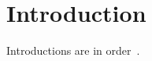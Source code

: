 \section{Introduction}
\label{sec:introduction}

Introductions are in order~\cite{aspvall1979linear}.

